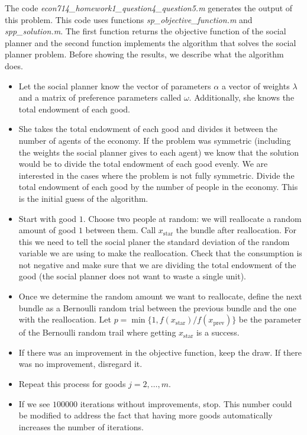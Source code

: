 \documentclass[a4paper,12pt]{article}
\begin{document}
    The code \textit{econ714\_homework1\_question4\_question5.m} generates the output of this problem. This code uses functions \textit{sp\_objective\_function.m} and \textit{spp\_solution.m}. The first function returns the objective function of the social planner and the second function implements the algorithm that solves the social planner problem. Before showing the results, we describe what the algorithm does. 
    
    \begin{itemize}
        \item Let the social planner know the vector of parameters $\alpha$ a vector of weights $\lambda$ and a matrix of preference parameters called $\omega$. Additionally, she knows the total endowment of each good. 
        
        \item She takes the total endowment of each good and divides it between the number of agents of the economy. If the problem was symmetric (including the weights the social planner gives to each agent) we know that the solution would be to divide the total endowment of each good evenly. We are interested in the cases where the problem is not fully symmetric. Divide the total endowment of each good by the number of people in the economy. This is the initial guess of the algorithm. 
        
        \item Start with good $1$. Choose two people at random: we will reallocate a random amount of good $1$ between them. Call $x_{\text{star}}$ the bundle after reallocation. For this we need to tell the social planer the standard deviation of the random variable we are using to make the reallocation. Check that the consumption is not negative and make sure that we are dividing the total endowment of the good (the social planner does not want to waste a single unit). 
        
        \item Once we determine the random amount we want to reallocate, define the next bundle as a Bernoulli random trial between the previous bundle and the one with the reallocation. Let $p = \min\{1,f(x_{\text{star}}) / f(x_{\text{prev}})\}$ be the parameter of the Bernoulli random trail where getting $x_{\text{star}}$ is a success. 
        
        \item If there was an improvement in the objective function, keep the draw. If there was no improvement, disregard it.  
        
        \item Repeat this process for goods $j = 2,\dots,m$. 
        
        \item If we see $100000$ iterations without improvements, stop. This number could be modified to address the fact that having more goods automatically increases the number of iterations. 
    \end{itemize}
    
\end{document}
